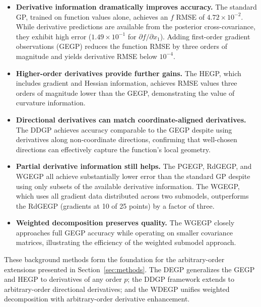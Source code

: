 \documentclass[12pt]{article}
\begin{document}
\begin{itemize}
	\item \textbf{Derivative information dramatically improves accuracy.} The standard GP, trained on function values alone, achieves an $f$ RMSE of $4.72 \times 10^{-2}$. While derivative predictions are available from the posterior cross-covariance, they exhibit high error ($1.49 \times 10^{-1}$ for $\partial f / \partial x_1$). Adding first-order gradient observations (GEGP) reduces the function RMSE by three orders of magnitude and yields derivative RMSE below $10^{-4}$.

	\item \textbf{Higher-order derivatives provide further gains.} The HEGP, which includes gradient and Hessian information, achieves RMSE values three orders of magnitude lower than the GEGP, demonstrating the value of curvature information.

	\item \textbf{Directional derivatives can match coordinate-aligned derivatives.} The DDGP achieves accuracy comparable to the GEGP despite using derivatives along non-coordinate directions, confirming that well-chosen directions can effectively capture the function's local geometry.

	\item \textbf{Partial derivative information still helps.} The PGEGP, RdGEGP, and WGEGP all achieve substantially lower error than the standard GP despite using only subsets of the available derivative information. The WGEGP, which uses all gradient data distributed across two submodels, outperforms the RdGEGP (gradients at 10 of 25 points) by a factor of three.

	\item \textbf{Weighted decomposition preserves quality.} The WGEGP closely approaches full GEGP accuracy while operating on smaller covariance matrices, illustrating the efficiency of the weighted submodel approach.
\end{itemize}

These background methods form the foundation for the arbitrary-order extensions presented in Section~\ref{sec:methods}. The DEGP generalizes the GEGP and HEGP to derivatives of any order $p$; the DDGP framework extends to arbitrary-order directional derivatives; and the WDEGP unifies weighted decomposition with arbitrary-order derivative enhancement.

\end{document}
